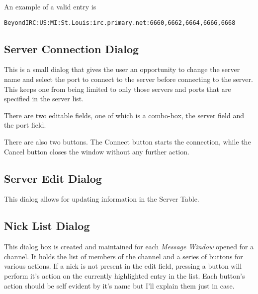 \documentclass[titlepage]{article}
\begin{document}
An example of a valid entry is
\begin{verbatim}
BeyondIRC:US:MI:St.Louis:irc.primary.net:6660,6662,6664,6666,6668
\end{verbatim}

\subsection{Server Connection Dialog}
This is a small dialog that gives the user an opportunity to change the
server name and select the port to connect to the server before connecting
to the server. This keeps one from being limited to only those servers and
ports that are specified in the server list.

There are two editable fields, one of which is a combo-box, the server
field and the port field.

There are also two buttons. The Connect button starts the connection, while
the Cancel button closes the window without any further action.

\subsection{Server Edit Dialog}
This dialog allows for updating information in the Server Table. 

\subsection{Nick List Dialog}
This dialog box is created and maintained for each \textit{Message
Window} opened for a channel. It holds the list of members of the
channel and a series of buttons for various actions. If a nick is not
present in the edit field, pressing a button will perform it's action
on the currently highlighted entry in the list. Each button's action
should be self evident by it's name but I'll explain them just in
case.
\end{document}
